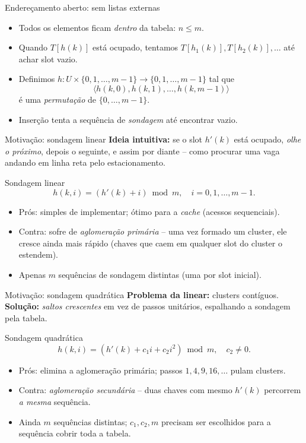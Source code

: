 \documentclass[aspectratio=169]{beamer}
\begin{document}
\begin{frame}{Endereçamento aberto: sem listas externas}
\begin{itemize}
\item Todos os elementos ficam \emph{dentro} da tabela: $n \le m$.
\item Quando $T[h(k)]$ está ocupado, tentamos $T[h_1(k)], T[h_2(k)], \dots$ até achar slot vazio.
\item Definimos $h : U \times \{0,1,\dots,m-1\} \to \{0,1,\dots,m-1\}$ tal que
$$\langle h(k,0), h(k,1), \dots, h(k,m-1) \rangle$$
é uma \emph{permutação} de $\{0,\dots,m-1\}$.
\item Inserção tenta a sequência de \emph{sondagem} até encontrar vazio.
\end{itemize}
\end{frame}

\begin{frame}{Motivação: sondagem linear}
\textbf{Ideia intuitiva:} se o slot $h'(k)$ está ocupado, \emph{olhe o próximo}, depois o seguinte, e assim por diante -- como procurar uma vaga andando em linha reta pelo estacionamento.
\begin{block}{Sondagem linear}
$$h(k,i) = (h'(k) + i) \bmod m, \quad i = 0, 1, \dots, m-1.$$
\end{block}
\begin{itemize}
\item \alert{Prós:} simples de implementar; ótimo para a \emph{cache} (acessos sequenciais).
\item \alert{Contra:} sofre de \emph{aglomeração primária} -- uma vez formado um cluster, ele cresce ainda mais rápido (chaves que caem em qualquer slot do cluster o estendem).
\item Apenas $m$ sequências de sondagem distintas (uma por slot inicial).
\end{itemize}
\end{frame}

\begin{frame}{Motivação: sondagem quadrática}
\textbf{Problema da linear:} clusters contíguos. \textbf{Solução:} \emph{saltos crescentes} em vez de passos unitários, espalhando a sondagem pela tabela.
\begin{block}{Sondagem quadrática}
$$h(k,i) = (h'(k) + c_1 i + c_2 i^2) \bmod m, \quad c_2 \neq 0.$$
\end{block}
\begin{itemize}
\item \alert{Prós:} elimina a aglomeração primária; passos $1, 4, 9, 16, \dots$ pulam clusters.
\item \alert{Contra:} \emph{aglomeração secundária} -- duas chaves com mesmo $h'(k)$ percorrem \emph{a mesma} sequência.
\item Ainda $m$ sequências distintas; $c_1, c_2, m$ precisam ser escolhidos para a sequência cobrir toda a tabela.
\end{itemize}
\end{frame}
\end{document}
